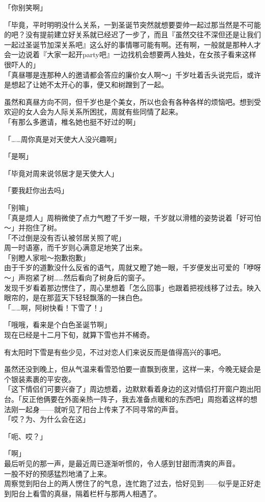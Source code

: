 「你别笑啊」

「毕竟，平时明明没什么关系，一到圣诞节突然就想要耍帅一起过那当然是不可能的吧？没有提前建立好关系就已经迟了一步了，而且『虽然交往不深但还是让我们一起过圣诞节加深关系吧』这么好的事情哪可能有啊。还有啊，一般就是那种人才会一边说着『大家一起开party吧』一边找机会想要两人独处，在女孩子看来这样很吓人的」\\

「真昼哪是连那种人的邀请都会答应的廉价女人啊～」千岁吐着舌头说完后，或许是想起了让她不太开心的事，便又和树蹭到了一起。

虽然和真昼方向不同，但千岁也是个美女，所以也会有各种各样的烦恼吧。想到受欢迎的女人会为人际关系所困扰，周就有些同情了起来。\\

「有那么多邀请，椎名她也挺不好过的啊」

「……周你真是对天使大人没兴趣啊」

「是啊」

「毕竟对周来说邻居才是天使大人」

「要我赶你出去吗」

「别嘛」\\

「真是烦人」周稍微使了点力气瞪了千岁一眼，千岁就以滑稽的姿势说着「好可怕～」并抱住了树。\\

「不过倒是没有否认被邻居关照了呢」\\

周一时语塞，而千岁则心满意足地笑了出来。\\

「别瞪人家啦～抱歉抱歉」\\

由于千岁的道歉没什么反省的语气，周就又瞪了她一眼，千岁便发出可爱的「咿呀～」声抱紧了树……然后看向了树身后的窗子。\\

发现千岁看着那边愣住了，周心里想着「怎么回事」也跟着把视线移了过去。映入眼帘的，是在那蓝天下轻轻飘落的一抹白色。\\

「……啊，阿树快看！下雪了！」

「哦哦，看来是个白色圣诞节啊」\\

现在已经是十二月下旬，就算下雪也并不稀奇。

有太阳时下雪是有些少见，不过对恋人们来说反而是值得高兴的事吧。

虽然还没到晚上，但从气温来看雪恐怕要一直飘到夜里，这样一来，今晚无疑会是个银装素裹的平安夜。\\

「这下情侣们可要兴奋了」周边想着，边默默看着身边的这对情侣打开窗户跑出阳台。「反正他俩要在外面亲热一阵子，我去准备点暖和的东西吧」周抱着这样的想法刚一起身——就听见了阳台上传来了不同寻常的声音。\\

「哎？为、为什么会在这」

「呃、哎？」

「啊」\\

最后听见的那一声，是最近周已逐渐听惯的，令人感到甘甜而清爽的声音。\\

一股不好的预感猛烈地涌了上来。\\

周察觉到阳台上的两人愣住了的气息，连忙跑了过去，恰好见到——似乎是正好走到阳台上看雪的真昼，隔着栏杆与那两人相遇了。
